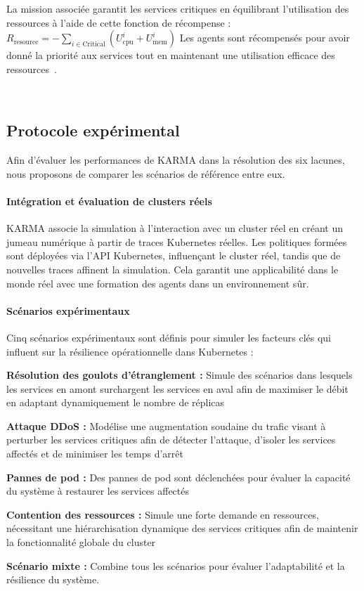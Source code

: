 La mission associée garantit les services critiques en équilibrant l'utilisation des ressources à l'aide de cette fonction de récompense :
$R_{\text{resource}} = - \sum_{i \in \text{Critical}} \left( U_{\text{cpu}}^i + U_{\text{mem}}^i \right)$
Les agents sont récompensés pour avoir donné la priorité aux services tout en maintenant une utilisation efficace des ressources~\cite{shahrad2020resource}.

\

\subsection{Protocole expérimental}

\noindent Afin d'évaluer les performances de KARMA dans la résolution des six lacunes, nous proposons de comparer les scénarios de référence entre eux.

\paragraph{\textbf{Intégration et évaluation de clusters réels}}

KARMA associe la simulation à l'interaction avec un cluster réel en créant un jumeau numérique à partir de traces Kubernetes réelles. Les politiques formées sont déployées via l'API Kubernetes, influençant le cluster réel, tandis que de nouvelles traces affinent la simulation. Cela garantit une applicabilité dans le monde réel avec une formation des agents dans un environnement sûr.

\paragraph{\textbf{Scénarios expérimentaux}}

\noindent Cinq scénarios expérimentaux sont définis pour simuler les facteurs clés qui influent sur la résilience opérationnelle dans Kubernetes :
%
\begin{enumerate*}[label=\textbf{\arabic*)}, itemjoin={;\quad }]
    \item \textbf{Résolution des goulots d'étranglement :} Simule des scénarios dans lesquels les services en amont surchargent les services en aval afin de maximiser le débit en adaptant dynamiquement le nombre de réplicas
    \item \textbf{Attaque DDoS :} Modélise une augmentation soudaine du trafic visant à perturber les services critiques afin de détecter l'attaque, d'isoler les services affectés et de minimiser les temps d'arrêt~\cite{Liu2018}
    \item \textbf{Pannes de pod :} Des pannes de pod sont déclenchées pour évaluer la capacité du système à restaurer les services affectés~\cite{burns2016borg}
    \item \textbf{Contention des ressources :} Simule une forte demande en ressources, nécessitant une hiérarchisation dynamique des services critiques afin de maintenir la fonctionnalité globale du cluster~\cite{Vhatkar2022}
    \item \textbf{Scénario mixte :} Combine tous les scénarios pour évaluer l'adaptabilité et la résilience du système.
\end{enumerate*}

